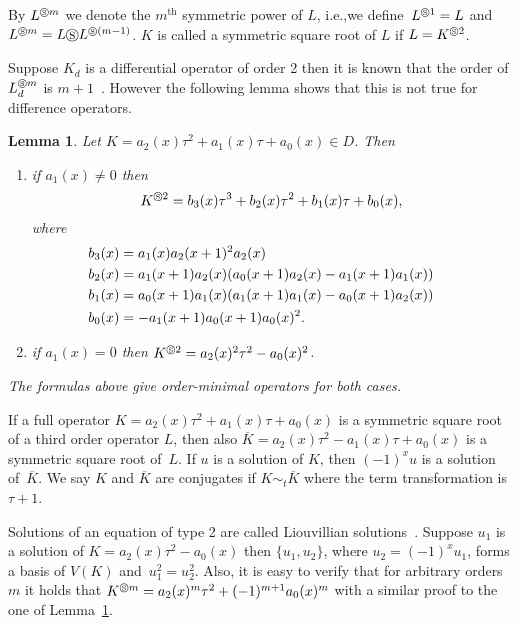 \documentclass{article}
\newtheorem{lemma}[theorem]{Lemma}
\begin{document}
By $L^{\circledS m}$ we denote the $m^\text{th}$ symmetric power of $L$, i.e.,we
define~$L^{\circledS 1}=L$ and $L^{\circledS m} = L{\circledS}L^{\circledS(m-1)}$.  $K$ is
called a symmetric square root of $L$ if $L=K^{\circledS 2}$.

Suppose $K_d$ is a differential operator of order 2 then it is known that the order of
$L_d^{\circledS m}$ is $m+1$~\cite[Lemma 3.2, (b)]{MS85}.  However the following lemma
shows that this is not true for difference operators.

\begin{lemma}\cite[Lemma 3]{GH10}\label{lemma:sym-power2}
 Let $K= a_2(x)\tau^2+a_1(x)\tau+a_0(x) \in D$. Then
\begin{enumerate}
 \item 
	if $a_1(x) \neq 0$ then 
	\[
        K^{\circledS 2}=b_3(x)\tau^3+b_2(x)\tau^2+b_1(x)\tau+b_0(x),
        \] 
        where
        \[
        \begin{aligned}
	\null\kern-1.5em b_3(x)&=a_1(x)a_2(x+1)^2a_2(x)\\
	\null\kern-1.5em b_2(x)&=a_1(x+1)a_2(x)(a_0(x+1)a_2(x)-a_1(x+1)a_1(x))\\
	\null\kern-1.5em b_1(x)&=a_0(x+1)a_1(x)(a_1(x+1)a_1(x)-a_0(x+1)a_2(x))\\
	\null\kern-1.5em b_0(x)&=-a_1(x+1)a_0(x+1)a_0(x)^2.
        \end{aligned}
        \]
\item if $a_1(x) =0$ then $K^{\circledS 2}=a_2(x)^2\tau^2-a_0(x)^2$.
\end{enumerate}
The formulas above give order-minimal operators for both cases.
\end{lemma}




If a full operator $K=a_2(x)\tau^2+a_1(x)\tau+a_0(x)$ is
a symmetric square root of a third order operator $L$, then also $\overline{K} =
a_2(x)\tau^2-a_1(x)\tau+a_0(x)$ is a symmetric square root of~$L$. If $u$ is a solution
of $K$, then $(-1)^x u$ is a solution of~$\overline{K}$. We say $K$ and $\overline{K}$ are conjugates if $K \sim_t \overline{K}$ where the term transformation is $\tau+1$.



Solutions of an equation of type 2 are called Liouvillian solutions~\cite{CH09,HS99,GH10}.
Suppose $u_1$ is a solution of $K=a_2(x)\tau^2-a_0(x)$ then $\{ u_1, u_2 \}$, where $u_2=
(-1)^xu_1$, forms a basis of $V(K)$ and~$u_1^2=u_2^2$.  Also, it is easy to verify that
for arbitrary orders~$m$ it holds that $K^{\circledS m}=a_2(x)^m\tau^2+(-1)^{m+1}a_0(x)^m$
with a similar proof to the one of Lemma~\ref{lemma:sym-power2}.
\end{document}
